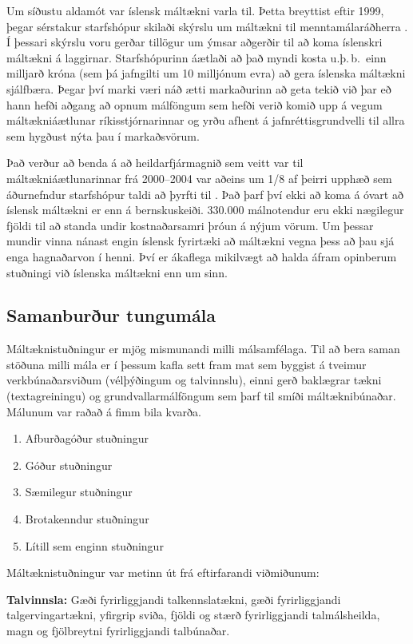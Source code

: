 \begin{multicols}{2}
Um síðustu aldamót var íslensk máltækni varla til. Þetta breyttist eftir 1999, þegar sérstakur starfshópur skilaði skýrslu um máltækni til menntamálaráðherra \cite{sky1}. Í þessari skýrslu voru gerðar tillögur um ýmsar aðgerðir til að koma íslenskri máltækni á laggirnar. Starfshópurinn áætlaði að það myndi kosta u.þ.\,b.~einn milljarð króna (sem þá jafngilti um 10 milljónum evra) að gera íslenska máltækni sjálfbæra. Þegar því marki væri náð ætti markaðurinn að geta tekið við þar eð hann hefði aðgang að opnum málföngum sem hefði verið komið upp á vegum máltækniáætlunar ríkisstjórnarinnar og yrðu afhent á jafnréttisgrundvelli til allra sem hygðust nýta þau í markaðsvörum.

Það verður að benda á að heildarfjármagnið sem veitt var til máltækniáætlunarinnar frá 2000--2004 var aðeins um 1/8 af þeirri upphæð sem áðurnefndur starfshópur taldi að þyrfti til \cite{ilrt1}.  Það þarf því ekki að koma á óvart að íslensk máltækni er enn á bernskuskeiði. 330.000 málnotendur eru ekki nægilegur fjöldi til að standa undir kostnaðarsamri þróun á nýjum vörum. Um þessar mundir vinna nánast engin íslensk fyrirtæki að máltækni vegna þess að þau sjá enga hagnaðarvon í henni. Því er ákaflega mikilvægt að halda áfram opinberum stuðningi við íslenska máltækni enn um sinn.

\subsection{Samanburður tungumála}

Máltæknistuðningur er mjög mismunandi milli málsamfélaga. Til að bera saman stöðuna milli mála er í þessum kafla sett fram mat sem byggist á tveimur verkbúnaðarsviðum (vélþýðingum og talvinnslu), einni gerð baklægrar tækni (textagreiningu) og grundvallarmálföngum sem þarf til smíði máltæknibúnaðar. Málunum var raðað á fimm bila kvarða.

\begin{enumerate}
\item Afburðagóður stuðningur
\item Góður stuðningur
\item Sæmilegur stuðningur
\item Brotakenndur stuðningur
\item Lítill sem enginn stuðningur
\end{enumerate}

Máltæknistuðningur var metinn út frá eftirfarandi viðmiðunum: 

\smallskip
\textbf{Talvinnsla:} Gæði fyrirliggjandi talkennslatækni, gæði fyrirliggjandi talgervingartækni, yfirgrip sviða, fjöldi og stærð fyrirliggjandi talmálsheilda, magn og fjölbreytni fyrirliggjandi talbúnaðar.


\end{multicols}
